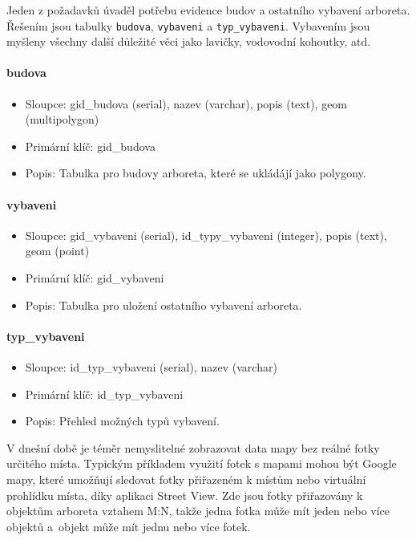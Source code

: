 \documentclass[12pt]{article}%
\begin{document}
{{Jeden z požadavků úvaděl potřebu evidence budov a ostatního vybavení arboreta.  Řešením jsou
tabulky \texttt{budova}, \texttt{vybaveni} a \texttt{typ\_vybaveni}. Vybavením jsou myšleny
všechny další důležité věci jako lavičky, vodovodní kohoutky, atd.
\paragraph{budova}
\begin{itemize}
\item Sloupce: gid\_budova (serial), nazev (varchar), popis (text), geom (multipolygon)
\item Primární klíč: gid\_budova
\item Popis: Tabulka pro budovy arboreta, které se ukládájí jako polygony.
\end{itemize}

\paragraph{vybaveni}
\begin{itemize}
\item Sloupce: gid\_vybaveni (serial), id\_typy\_vybaveni (integer), popis (text),
geom (point)
\item Primární klíč: gid\_vybaveni
\item Popis: Tabulka pro uložení ostatního vybavení arboreta.
\end{itemize}

\paragraph{typ\_vybaveni}
\begin{itemize}
\item Sloupce: id\_typ\_vybaveni (serial), nazev (varchar)
\item Primární klíč: id\_typ\_vybaveni
\item Popis: Přehled možných typů vybavení.
\end{itemize}

V dnešní době je téměr nemyslitelné zobrazovat data mapy bez reálné fotky určitého místa.
Typickým příkladem využití fotek s mapami mohou být Google mapy, které umožňují sledovat fotky
přiřazeném k místům nebo virtuální prohlídku místa, díky aplikaci Street View. Zde jsou fotky
přiřazovány k objektům arboreta vztahem M:N, takže jedna fotka může mít jeden nebo více objektů 
a~objekt může mít jednu nebo více fotek.

}}
\end{document}
